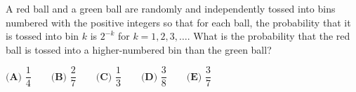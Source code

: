A red ball and a green ball are randomly and independently tossed into bins numbered with the positive integers so that for each ball, the probability that it is tossed into bin $k$ is $2^{-k}$ for $k=1,2,3,\dots$. What is the probability that the red ball is tossed into a higher-numbered bin than the green ball?

$\textbf{(A) } \dfrac{1}{4} \qquad\textbf{(B) } \dfrac{2}{7} \qquad\textbf{(C) } \dfrac{1}{3} \qquad\textbf{(D) } \dfrac{3}{8} \qquad\textbf{(E) } \dfrac{3}{7}$
